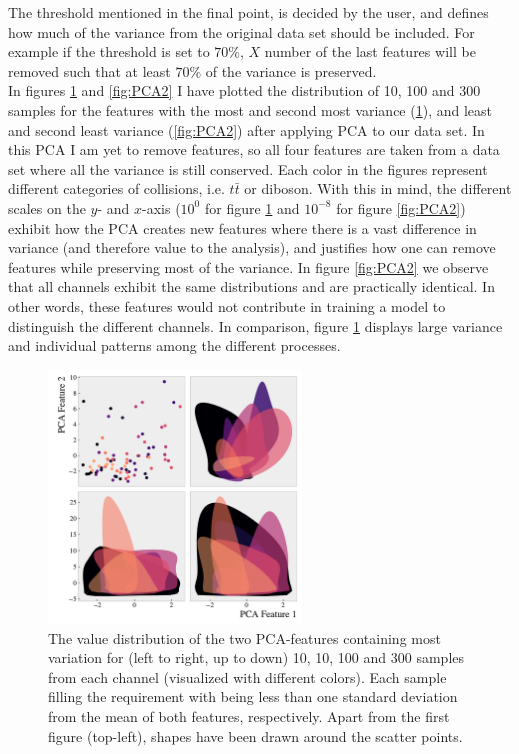 The threshold mentioned in the final point, is decided by the user, and defines how much of the variance from the original data 
set should be included. For example if the threshold is set to $70\%$, $X$ number of the last features will be removed such 
that at least $70\%$ of the variance is preserved.
\\
In figures \ref{fig:PCA1} and \ref{fig:PCA2} I have plotted the distribution of 10, 100 and 300 samples 
for the features with the most and second most variance (\ref{fig:PCA1}), and least and second least 
variance (\ref{fig:PCA2}) after applying \ac{PCA} to our data set. In this \ac{PCA} I am yet to remove features, 
so all four features are taken from a data set where all the variance is still conserved. Each color in the figures 
represent different categories of collisions, i.e. $t\bar{t}$ or diboson. With this in 
mind, the different scales on the $y$- and $x$-axis ($10^0$ for figure \ref{fig:PCA1} and $10^{-8}$ for figure 
\ref{fig:PCA2}) exhibit how the \ac{PCA} creates new features where there is a vast difference in variance 
(and therefore value to the analysis), and justifies how one can remove features while preserving most of the variance. 
In figure \ref{fig:PCA2} we observe that all channels exhibit the same distributions and are practically identical. 
In other words, these features would not contribute in training a model to distinguish the different channels. 
In comparison, figure \ref{fig:PCA1} displays large variance and individual patterns among the different processes.
\begin{figure}
    \centering
    \includegraphics[width=0.6\textwidth]{Figures/MLResults/DataHandling/PCA/PCAPlotFirst.pdf}
    \caption[The value distribution of the two leading \acs{PCA}-features.]{The value distribution of 
    the two \ac{PCA}-features containing most variation for (left to right, up to down) 10, 10, 100 and 
    300 samples from each channel (visualized with different colors). Each sample filling the requirement with being less than one standard 
    deviation from the mean of both features, respectively. Apart from the first figure (top-left), shapes have been drawn around the scatter 
    points.}
    \label{fig:PCA1}
\end{figure}
